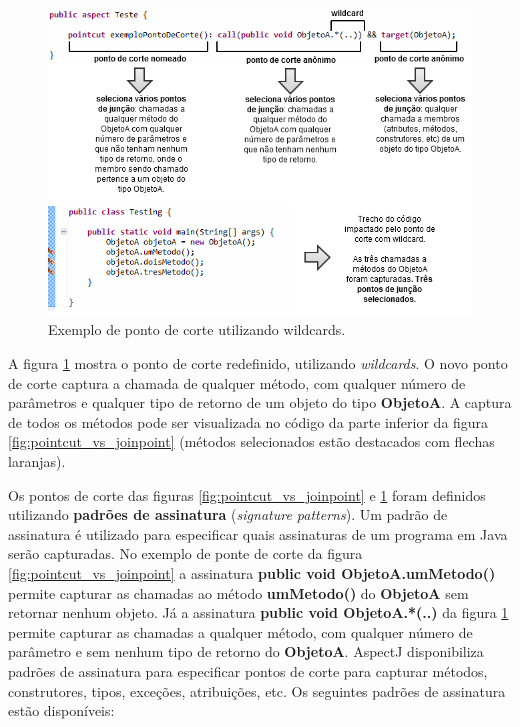 \begin{figure}
	\centering
	\includegraphics{img/pointcut_vs_joinpoint_wildcard.png}
	\caption{Exemplo de ponto de corte utilizando
	wildcards.}\label{fig:pointcut_vs_joinpoint_wildcard}
\end{figure}

A figura \ref{fig:pointcut_vs_joinpoint_wildcard} mostra o ponto de corte redefinido, utilizando \textit{wildcards}. 
O novo ponto de corte captura a chamada de qualquer método, com qualquer número
de parâmetros e qualquer tipo de retorno de um objeto do tipo \textbf{ObjetoA}.
A captura de todos os métodos pode ser visualizada no código da parte inferior
da figura \ref{fig:pointcut_vs_joinpoint} (métodos selecionados estão destacados
com flechas laranjas).

Os pontos de corte das figuras \ref{fig:pointcut_vs_joinpoint} e \ref{fig:pointcut_vs_joinpoint_wildcard} foram definidos utilizando \textbf{padrões
de assinatura} (\textit{signature patterns}). Um padrão de assinatura é utilizado para especificar quais assinaturas de um programa em Java serão capturadas. No
exemplo de ponte de corte da figura \ref{fig:pointcut_vs_joinpoint} a assinatura \textbf{public void ObjetoA.umMetodo()} permite capturar as chamadas
ao método \textbf{umMetodo()} do \textbf{ObjetoA} sem retornar nenhum objeto. Já a assinatura \textbf{public void ObjetoA.*(..)} da 
figura \ref{fig:pointcut_vs_joinpoint_wildcard} permite capturar as chamadas a qualquer método, com qualquer número de parâmetro e sem nenhum
tipo de retorno do \textbf{ObjetoA}. AspectJ disponibiliza padrões de assinatura para especificar pontos de corte para capturar métodos, construtores,
tipos, exceções, atribuições, etc. Os seguintes padrões de assinatura estão disponíveis:

